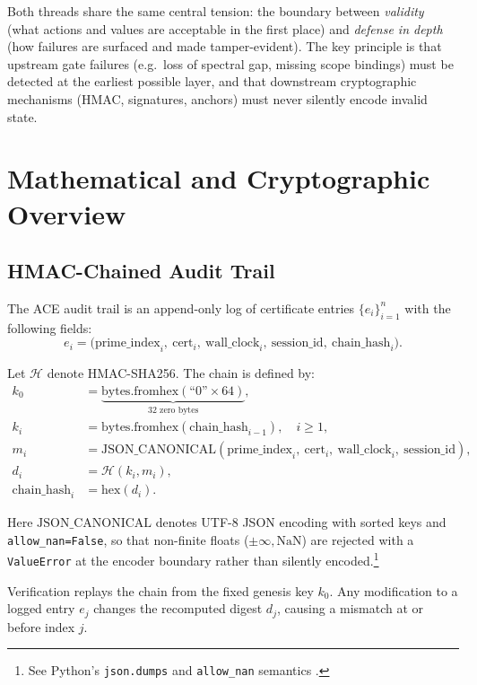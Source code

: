 \documentclass[11pt]{article}
\begin{document}
Both threads share the same central tension: the boundary between
\emph{validity} (what actions and values are acceptable in the first
place) and \emph{defense in depth} (how failures are surfaced and
made tamper-evident). The key principle is that upstream gate failures
(e.g.\ loss of spectral gap, missing scope bindings) must be detected
at the earliest possible layer, and that downstream cryptographic
mechanisms (HMAC, signatures, anchors) must never silently encode
invalid state.

\section{Mathematical and Cryptographic Overview}

\subsection{HMAC-Chained Audit Trail}

The ACE audit trail is an append-only log of certificate entries
\(\{e_i\}_{i=1}^n\) with the following fields:
\[
  e_i = \bigl(\text{prime\_index}_i,\ \text{cert}_i,\ \text{wall\_clock}_i,\
         \text{session\_id},\ \text{chain\_hash}_i\bigr).
\]

Let \(\mathcal{H}\) denote HMAC-SHA256. The chain is defined by:
\begin{align}
  k_0 &= \underbrace{\text{bytes.fromhex}(\text{``0''}\times 64)}_{\text{32 zero bytes}},\\
  k_i &= \text{bytes.fromhex}(\text{chain\_hash}_{i-1}), \quad i \ge 1,\\
  m_i &= \text{JSON\_CANONICAL}\left(
           \text{prime\_index}_i,\ \text{cert}_i,\ \text{wall\_clock}_i,\ \text{session\_id}
        \right), \\
  d_i &= \mathcal{H}(k_i, m_i), \\
  \text{chain\_hash}_i &= \text{hex}(d_i).
\end{align}

Here \(\text{JSON\_CANONICAL}\) denotes UTF-8 JSON encoding with
sorted keys and \texttt{allow\_nan=False}, so that non-finite floats
(\(\pm\infty, \text{NaN}\)) are rejected with a \texttt{ValueError}
at the encoder boundary rather than silently encoded.\footnote{See
Python's \texttt{json.dumps} and \texttt{allow\_nan} semantics
\cite{web:32,web:34}.}

Verification replays the chain from the fixed genesis key \(k_0\).
Any modification to a logged entry \(e_j\) changes the recomputed
digest \(d_j\), causing a mismatch at or before index \(j\).
\end{document}
